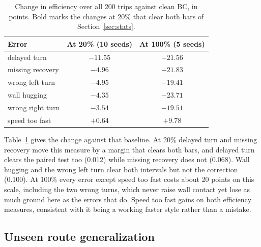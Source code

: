 \documentclass[conference]{IEEEtran}
\begin{document}
\begin{table}[tbp]
\centering\small
\begin{tabular}{@{}lcc@{}}
\toprule
Error & At 20\% (10 seeds) & At 100\% (5 seeds)\\
\midrule
delayed turn & $\mathbf{-11.55}$ & $-21.56$\\
missing recovery & $\mathbf{-4.96}$ & $-21.83$\\
wrong left turn & $-4.95$ & $-19.41$\\
wall hugging & $-4.35$ & $-23.71$\\
wrong right turn & $-3.54$ & $-19.51$\\
speed too fast & $+0.64$ & $+9.78$\\
\bottomrule
\end{tabular}
\caption{Change in efficiency over all 200 trips against clean BC, in points. Bold marks the changes at 20\% that
clear both bars of Section~\ref{sec:stats}.}
\label{tab:effall}
\end{table}

Table~\ref{tab:effall} gives the change against that baseline. At 20\% delayed turn and missing recovery move
this measure by a margin that clears both bars, and delayed turn clears the paired test too (0.012) while missing
recovery does not (0.068). Wall hugging and the wrong left turn clear both intervals but not the correction
(0.100). At 100\% every error except speed too fast costs about 20 points on this
scale, including the two wrong turns, which never raise wall contact yet lose as much ground here as the errors
that do. Speed too fast gains on both efficiency measures, consistent with it being a working faster style rather
than a mistake.

\subsection{Unseen route generalization}\label{sec:generalization}
\end{document}
